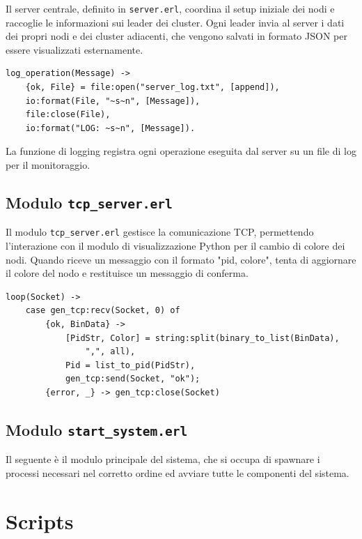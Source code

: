 \documentclass[12pt, a4paper]{report}
\begin{document}
Il server centrale, definito in \texttt{server.erl}, coordina il setup iniziale dei nodi e raccoglie le informazioni sui leader dei cluster. Ogni leader invia al server i dati dei propri nodi e dei cluster adiacenti, che vengono salvati in formato JSON per essere visualizzati esternamente.

\begin{tcolorbox}[title=Funzione di Logging]
\begin{verbatim}
log_operation(Message) ->
    {ok, File} = file:open("server_log.txt", [append]),
    io:format(File, "~s~n", [Message]),
    file:close(File),
    io:format("LOG: ~s~n", [Message]).
\end{verbatim}
\end{tcolorbox}

La funzione di logging registra ogni operazione eseguita dal server su un file di log per il monitoraggio.

\subsection{Modulo \texttt{tcp\_server.erl}}

Il modulo \texttt{tcp\_server.erl} gestisce la comunicazione TCP, permettendo l'interazione con il modulo di visualizzazione Python per il cambio di colore dei nodi. Quando riceve un messaggio con il formato "pid, colore", tenta di aggiornare il colore del nodo e restituisce un messaggio di conferma.

\begin{tcolorbox}[title=Comunicazione TCP]
\begin{verbatim}
loop(Socket) ->
    case gen_tcp:recv(Socket, 0) of
        {ok, BinData} ->
            [PidStr, Color] = string:split(binary_to_list(BinData), 
                ",", all),
            Pid = list_to_pid(PidStr),
            gen_tcp:send(Socket, "ok");
        {error, _} -> gen_tcp:close(Socket)
\end{verbatim}
\end{tcolorbox}

\subsection{Modulo \texttt{start\_system.erl}}

Il seguente \`e il modulo principale del sistema, che si occupa di spawnare i processi necessari nel corretto ordine ed avviare tutte le componenti del sistema.

\section{Scripts}
\end{document}
